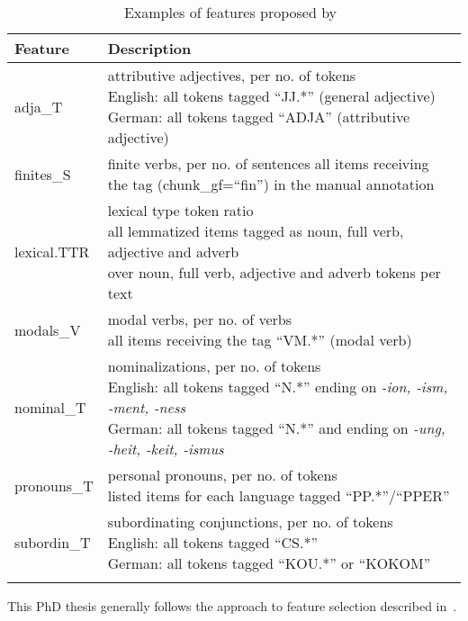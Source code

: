 \begin{longtable}[H]{p{2.3cm}|p{13cm}}
		\toprule

	Feature & Description \\
	\midrule
	adja\_T & \specialcell{attributive adjectives, per no. of tokens\\English: all tokens tagged ``JJ.*'' (general adjective)\\German: all tokens tagged ``ADJA'' (attributive adjective)}\\%
	finites\_S & finite verbs, per no. of sentences all items receiving the tag  (chunk\_gf=``fin'') in the manual annotation\\%
	lexical.TTR & \specialcell{lexical type token ratio\\all lemmatized items tagged as noun, full verb, adjective and adverb \\over noun, full verb, adjective and adverb tokens per text}\\%
	modals\_V & \specialcell{modal verbs, per no. of verbs\\all items receiving the tag ``VM.*'' (modal verb)}\\%
	nominal\_T & \specialcell{nominalizations, per no. of tokens\\English: all tokens tagged ``N.*'' ending on \textit{-ion, -ism, -ment, -ness}\\German: all tokens tagged ``N.*'' and ending on \textit{-ung, -heit, -keit, -ismus}}\\%
	pronouns\_T & \specialcell{personal pronouns, per no. of tokens\\listed items for each language tagged ``PP.*''/``PPER''}\\%
	subordin\_T  & \specialcell{subordinating conjunctions, per no. of tokens\\English: all tokens tagged ``CS.*''\\German: all tokens tagged ``KOU.*'' or ``KOKOM''}\\%
	\bottomrule
	
	\caption{\label{tab:everts}Examples of features proposed by~\citet{Evert2017}}\\
\end{longtable}

This PhD thesis generally follows the approach to feature selection described in~\citet{Evert2017}.
 
